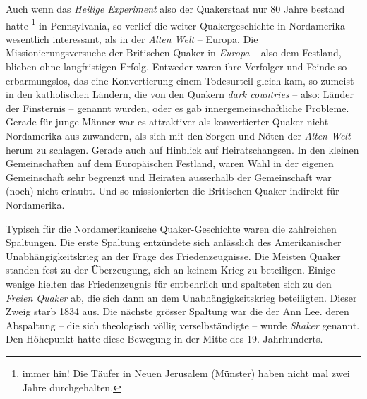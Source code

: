 \medskip

Auch wenn das \textit{Heilige Experiment} also der Quakerstaat nur 80 Jahre
bestand hatte \footnote{immer hin! Die Täufer in Neuen Jerusalem (Münster) haben
nicht mal zwei Jahre durchgehalten.} in Pennsylvania, so verlief die weiter
Quakergeschichte in Nordamerika wesentlich interessant, als in der \textit{Alten
Welt} -- Europa. Die Missionierungsversuche der Britischen Quaker in
\textit{Europa} -- also dem Festland, blieben ohne langfristigen Erfolg.
Entweder waren ihre Verfolger und Feinde so erbarmungslos, das eine
Konvertierung einem Todesurteil gleich kam, so zumeist in den katholischen
Ländern, die von den Quakern \textit{dark countries} -- also: Länder der
Finsternis -- genannt wurden, oder es gab innergemeinschaftliche Probleme.
Gerade
für junge Männer war es attraktiver als konvertierter Quaker nicht Nordamerika
aus zuwandern, als sich mit den Sorgen und Nöten der \textit{Alten Welt} herum
zu
schlagen. Gerade auch auf Hinblick auf Heiratschangsen. In den kleinen
Gemeinschaften auf dem Europäischen Festland, waren Wahl in der eigenen
Gemeinschaft sehr begrenzt und Heiraten ausserhalb der Gemeinschaft war (noch)
nicht erlaubt. Und so missionierten die Britischen Quaker indirekt für
Nordamerika.

\medskip

Typisch für die Nordamerikanische Quaker-Geschichte waren die zahlreichen
Spaltungen. Die erste Spaltung entzündete sich anlässlich des Amerikanischer
Unabhängigkeitskrieg an der Frage des Friedenzeugnisse. Die Meisten Quaker
standen fest zu der Überzeugung, sich an keinem Krieg zu beteiligen. Einige
wenige hielten das Friedenzeugnis für entbehrlich und spalteten sich zu den
\textit{Freien Quaker} ab, die sich dann an dem Unabhängigkeitskrieg
beteiligten. Dieser Zweig starb 1834 aus. Die nächste grösser Spaltung war die
der Ann Lee. deren Abspaltung -- die sich theologisch völlig verselbständigte --
wurde \textit{Shaker} genannt. Den Höhepunkt hatte diese Bewegung in der Mitte
des 19. Jahrhunderts.

\medskip

